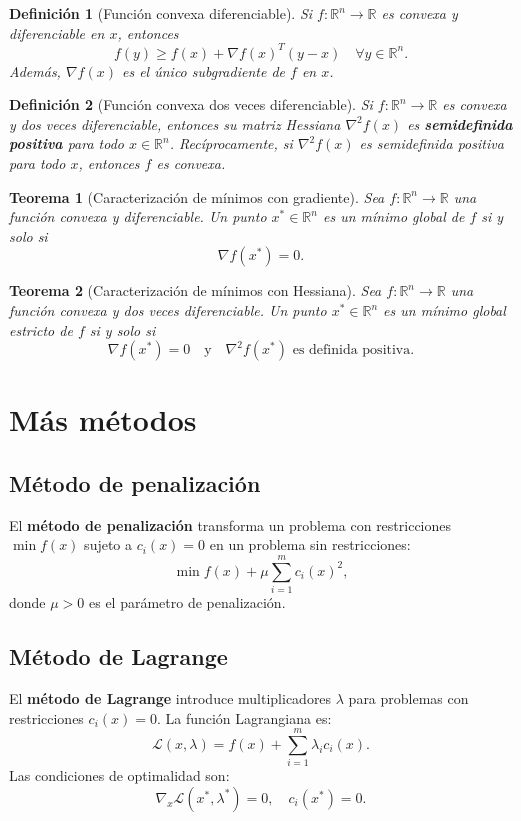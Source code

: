 \documentclass[12pt]{book}
\newtheorem{theorem}{Teorema}
\newtheorem{definition}{Definición}
\theoremstyle{definition}
\theoremstyle{plain}
\theoremstyle{remark}
\begin{document}
\begin{definition}[Función convexa diferenciable]
Si \( f: \mathbb{R}^n \to \mathbb{R} \) es convexa y diferenciable en \( x \), entonces
\[
f(y) \geq f(x) + \nabla f(x)^T (y - x) \quad \forall y \in \mathbb{R}^n.
\]
Además, \( \nabla f(x) \) es el único subgradiente de \( f \) en \( x \).
\end{definition}

\begin{definition}[Función convexa dos veces diferenciable]
Si \( f: \mathbb{R}^n \to \mathbb{R} \) es convexa y dos veces diferenciable, entonces su matriz Hessiana \( \nabla^2 f(x) \) es \textbf{semidefinida positiva} para todo \( x \in \mathbb{R}^n \). Recíprocamente, si \( \nabla^2 f(x) \) es semidefinida positiva para todo \( x \), entonces \( f \) es convexa.
\end{definition}

\begin{theorem}[Caracterización de mínimos con gradiente]
Sea \( f: \mathbb{R}^n \to \mathbb{R} \) una función convexa y diferenciable. Un punto \( x^* \in \mathbb{R}^n \) es un mínimo global de \( f \) si y solo si
\[
\nabla f(x^*) = 0.
\]
\end{theorem}

\begin{theorem}[Caracterización de mínimos con Hessiana]
Sea \( f: \mathbb{R}^n \to \mathbb{R} \) una función convexa y dos veces diferenciable. Un punto \( x^* \in \mathbb{R}^n \) es un mínimo global estricto de \( f \) si y solo si
\[
\nabla f(x^*) = 0 \quad \text{y} \quad \nabla^2 f(x^*) \text{ es definida positiva.}
\]
\end{theorem}

\chapter{M\'as métodos}

\section{Método de penalización}
El \textbf{método de penalización} transforma un problema con restricciones \( \min f(x) \) sujeto a \( c_i(x) = 0 \) en un problema sin restricciones:
\[
\min f(x) + \mu \sum_{i=1}^m c_i(x)^2,
\]
donde \( \mu > 0 \) es el parámetro de penalización.

\section{Método de Lagrange}
El \textbf{método de Lagrange} introduce multiplicadores \( \lambda \) para problemas con restricciones \( c_i(x) = 0 \). La función Lagrangiana es:
\[
\mathcal{L}(x, \lambda) = f(x) + \sum_{i=1}^m \lambda_i c_i(x).
\]
Las condiciones de optimalidad son:
\[
\nabla_x \mathcal{L}(x^*, \lambda^*) = 0, \quad c_i(x^*) = 0.
\]
\end{document}
